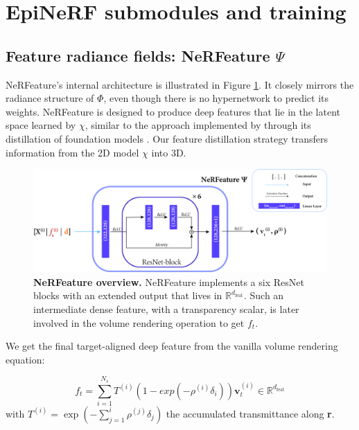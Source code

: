 \section{EpiNeRF submodules and training}

\subsection{Feature radiance fields: NeRFeature $\Psi$}

NeRFeature's internal architecture is illustrated in Figure \ref{fig:supp_nerfeature}. It closely mirrors the radiance structure of $\Phi$, even though there is no hypernetwork to predict its weights. NeRFeature is designed to produce deep features that lie in the latent space learned by $\chi$, similar to the approach implemented by \cite{ye2023featurenerf} through its distillation of foundation models \cite{oquab2023dinov2}. Our feature distillation strategy transfers information from the 2D model $\chi$ into 3D.  
\begin{figure}[htp!]
    \begin{center}
  \includegraphics[width=\linewidth]{images/epinerf/supp_nerfeature.png}
  \caption{\textbf{NeRFeature overview.} NeRFeature implements a six ResNet blocks with an extended output that lives in $\mathbb{R}^{d_{\text{feat}}}$. Such an intermediate dense feature, with a transparency scalar, is later involved in the volume rendering operation to get $f_{t}$.}
  \label{fig:supp_nerfeature}
  \end{center}
\end{figure}


We get the final target-aligned deep feature from the vanilla volume rendering equation:

\begin{equation}
\label{eq:ft_vr}
    f_{t} = \sum_{i=1}^{N_{s}} T^{(i)}(1-exp(-\rho^{(i)}\delta_{i}))\mathbf{v}_{t}^{(i)} \in \mathbb{R}^{d_{\text{feat}}}
\end{equation}
with $T^{(i)} = \exp\left(-\sum_{j=1}^{i}\rho^{(j)}\delta_{j}\right)$ the accumulated transmittance along \textbf{r}.

